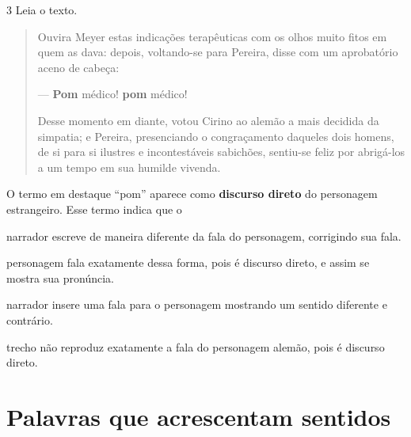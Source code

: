 \num{3} Leia o texto.

\begin{quote}
Ouvira Meyer estas indicações terapêuticas com os olhos muito fitos em
quem as dava: depois, voltando-se para Pereira, disse com um aprobatório
aceno de cabeça:

— \textbf{Pom} médico! \textbf{pom} médico!

Desse momento em diante, votou Cirino ao alemão a mais decidida da
simpatia; e Pereira, presenciando o congraçamento daqueles dois homens,
de si para si ilustres e incontestáveis sabichões, sentiu-se feliz por
abrigá-los a um tempo em sua humilde vivenda.

\end{quote}

\noindent{}O termo em destaque “pom” aparece como \textbf{discurso direto} do
personagem estrangeiro. Esse termo indica que o

\begin{escolha}
\item narrador escreve de maneira diferente da fala do personagem,
corrigindo sua fala.

\item personagem fala exatamente dessa forma, pois é discurso direto,
e assim se mostra sua pronúncia.

\item narrador insere uma fala para o personagem mostrando um sentido
diferente e contrário.

\item trecho não reproduz exatamente a fala do personagem alemão,
pois é discurso direto.
\end{escolha}


\chapter[Palavras que acrescentam sentidos]{\Large Palavras que acrescentam sentidos}


